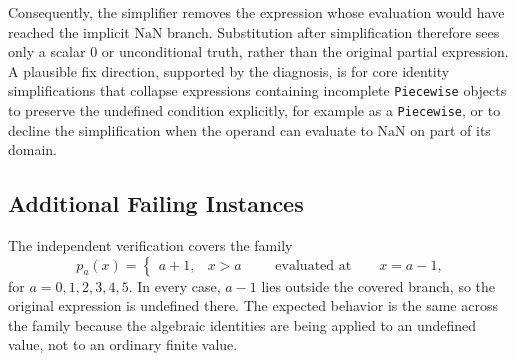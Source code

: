 \documentclass[11pt]{article}
\begin{document}
Consequently, the simplifier removes the expression whose evaluation would have
reached the implicit \(\mathrm{NaN}\) branch.  Substitution after simplification
therefore sees only a scalar \(0\) or unconditional truth, rather than the
original partial expression.  A plausible fix direction, supported by the
diagnosis, is for core identity simplifications that collapse expressions
containing incomplete \texttt{Piecewise} objects to preserve the undefined
condition explicitly, for example as a \texttt{Piecewise}, or to decline the
simplification when the operand can evaluate to \(\mathrm{NaN}\) on part of its
domain.

\subsection{Additional Failing Instances}

The independent verification covers the family
\[
  p_a(x)=\begin{cases}
    a+1, & x>a
  \end{cases}
  \qquad\text{evaluated at}\qquad x=a-1,
\]
for \(a=0,1,2,3,4,5\).  In every case, \(a-1\) lies outside the covered branch,
so the original expression is undefined there.  The expected behavior is the
same across the family because the algebraic identities are being applied to an
undefined value, not to an ordinary finite value.
\end{document}
